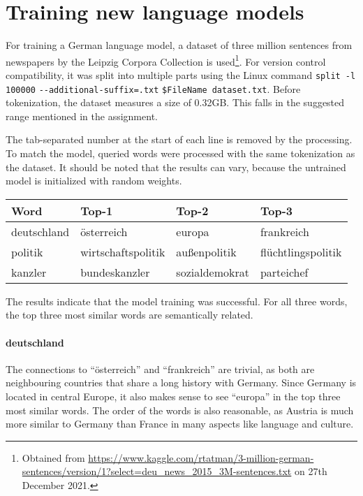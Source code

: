 \section{Training new language models}

\autocite{dataset} For training a German language model, a dataset of three million sentences from newspapers by the Leipzig Corpora Collection is used\footnote{Obtained from \url{https://www.kaggle.com/rtatman/3-million-german-sentences/version/1?select=deu_news_2015_3M-sentences.txt} on 27th December 2021.}.
For version control compatibility, it was split into multiple parts using the Linux command \verb|split -l 100000| \verb|--additional-suffix=.txt| \verb|$FileName dataset.txt|.
Before tokenization, the dataset measures a size of 0.32GB.
This falls in the suggested range mentioned in the assignment.

The tab-separated number at the start of each line is removed by the processing.
To match the model, queried words were processed with the same tokenization as the dataset.
It should be noted that the results can vary, because the untrained model is initialized with random weights.

\begin{table}[hb]
\center
\begin{tabular}{|l|l|l|l|}
\hline
\textbf{Word} & \textbf{Top-1}     & \textbf{Top-2} & \textbf{Top-3}     \\ \hline
deutschland   & österreich         & europa         & frankreich         \\ \hline
politik       & wirtschaftspolitik & außenpolitik   & flüchtlingspolitik \\ \hline
kanzler       & bundeskanzler      & sozialdemokrat & parteichef         \\ \hline
\end{tabular}
\end{table}

The results indicate that the model training was successful.
For all three words, the top three most similar words are semantically related.

\paragraph{deutschland}
The connections to \enquote{österreich} and \enquote{frankreich} are trivial, as both are neighbouring countries that share a long history with Germany.
Since Germany is located in central Europe, it also makes sense to see \enquote{europa} in the top three most similar words.
The order of the words is also reasonable, as Austria is much more similar to Germany than France in many aspects like language and culture.

